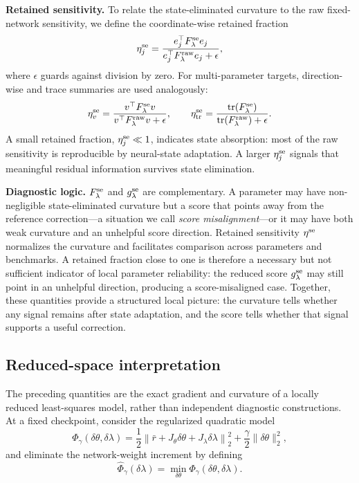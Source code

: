 \documentclass[preprint,12pt]{elsarticle}
\begin{document}
\medskip\noindent
\textbf{Retained sensitivity.}
To relate the state-eliminated curvature to the raw fixed-network sensitivity, we define the coordinate-wise retained fraction
\begin{equation}
    \eta_j^{\rm se}=
    \frac{e_j^\top F_\lambda^{\rm se} e_j}
         {e_j^\top F_{\lambda}^{\rm raw} e_j+\epsilon},
    \label{eq:eta_coordinate}
\end{equation}
where $\epsilon$ guards against division by zero.  For multi-parameter targets, direction-wise and trace summaries are used analogously:
\begin{equation}
    \eta_v^{\rm se}=
    \frac{v^\top F_\lambda^{\rm se} v}
         {v^\top F_{\lambda}^{\rm raw} v+\epsilon},
    \qquad
    \eta_{\rm tr}^{\rm se}=
    \frac{\operatorname{tr}(F_\lambda^{\rm se})}
         {\operatorname{tr}(F_{\lambda}^{\rm raw})+\epsilon}.
    \label{eq:eta_direction_trace}
\end{equation}
A small retained fraction, $\eta_j^{\rm se}\ll 1$, indicates state absorption: most of the raw sensitivity is reproducible by neural-state adaptation.  A larger $\eta_j^{\rm se}$ signals that meaningful residual information survives state elimination.

\medskip\noindent
\textbf{Diagnostic logic.}
$F_\lambda^{\rm se}$ and $g_\lambda^{\rm se}$ are complementary.  A parameter may have non-negligible state-eliminated curvature but a score that points away from the reference correction---a situation we call \emph{score misalignment}---or it may have both weak curvature and an unhelpful score direction.  Retained sensitivity $\eta^{\rm se}$ normalizes the curvature and facilitates comparison across parameters and benchmarks.  A retained fraction close to one is therefore a necessary but not sufficient indicator of local parameter reliability: the reduced score $g_\lambda^{\rm se}$ may still point in an unhelpful direction, producing a score-misaligned case.  Together, these quantities provide a structured local picture: the curvature tells whether any signal remains after state adaptation, and the score tells whether that signal supports a useful correction.

\subsection{Reduced-space interpretation}

The preceding quantities are the exact gradient and curvature of a locally reduced least-squares model, rather than independent diagnostic constructions.  At a fixed checkpoint, consider the regularized quadratic model
\begin{equation}
\Phi_\gamma(\delta\theta,\delta\lambda)
=
\frac12\left\|\bar r+J_\theta\delta\theta+J_\lambda\delta\lambda\right\|_2^2
+\frac{\gamma}{2}\|\delta\theta\|_2^2,
\label{eq:joint_local_model}
\end{equation}
and eliminate the network-weight increment by defining
\begin{equation}
\widehat\Phi_\gamma(\delta\lambda)
=
\min_{\delta\theta}\Phi_\gamma(\delta\theta,\delta\lambda).
\label{eq:reduced_local_model}
\end{equation}
\end{document}
